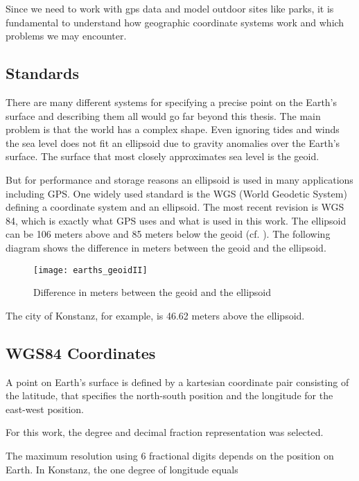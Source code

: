 Since we need to work with gps data and model outdoor sites like parks, it is fundamental to understand how geographic coordinate systems work and which problems we may encounter.

\subsection{Standards}

There are many different systems for specifying a precise point on the Earth's surface and describing them all would go far beyond this thesis. The main problem is that the world has a complex shape. Even ignoring tides and winds the sea level does not fit an ellipsoid due to gravity anomalies over the Earth's surface. The surface that most closely approximates sea level is the geoid. 

But for performance and storage reasons an ellipsoid is used in many applications including GPS. One widely used standard is the WGS (World Geodetic System) defining a coordinate system and an ellipsoid. The most recent revision is WGS 84, which is exactly what GPS uses and what is used in this work. The ellipsoid can be 106 meters above and 85 meters below the geoid (cf. \cite{geoid}). The following diagram shows the difference in meters between the geoid and the ellipsoid.

\begin{figure}[H]
\centering
\texttt{[image: earths\_geoidII]}
\caption{Difference in meters between the geoid and the ellipsoid \cite{nasageoid}}
\end{figure}

The city of Konstanz, for example, is 46.62 meters above the ellipsoid.

\subsection{WGS84 Coordinates}
A point on Earth's surface is defined by a kartesian coordinate pair consisting of the latitude, that specifies the north-south position and the longitude for the east-west position. 


For this work, the degree and decimal fraction representation was selected.

The maximum resolution using 6 fractional digits depends on the position on Earth. In Konstanz, the one degree of longitude equals

